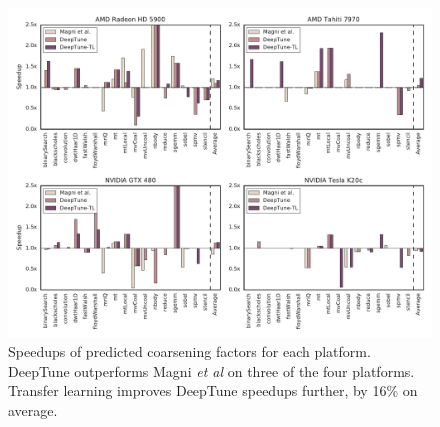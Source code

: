 \begin{figure}
  \centering %
  \includegraphics[width=\textwidth]{img/pact-speedup}%
  \caption[Speedups of predicted thread coarsening factors]{%
    Speedups of predicted coarsening factors for each platform. DeepTune
    outperforms Magni \emph{et al} on three of the four platforms. Transfer
    learning improves DeepTune speedups further, by 16\% on average.%
  }%
  \label{fig:pact-speedup} %
\end{figure}
